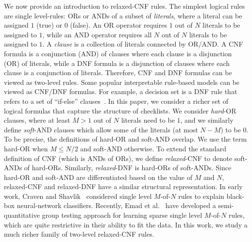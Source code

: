 We now provide an introduction to relaxed-CNF rules. The simplest logical rules are single level-rules: ORs or ANDs of a subset of \textit{literals}, where a literal can be assigned  $ 1 $ (true) or  $ 0 $ (false). 
An OR operator requires $ 1 $ out of $ N $ literals to be assigned to  $ 1 $, while an AND operator requires all $N$ out of $N$ literals to be assigned to  $ 1 $.   A \emph{clause} is a collection of literals connected by  OR/AND.  A CNF   formula  is a conjunction (AND) of {clauses} where each clause is a disjunction (OR) of {literals}, while  a DNF  formula is a disjunction of clauses where each clause is a conjunction of literals. Therefore, CNF  and DNF  formulas can be viewed as two-level rules. Some popular interpretable rule-based models can be viewed as  CNF/DNF formulas. For example, a decision set is a DNF rule that refers to a set of ``if-else'' clauses~\cite{ignatiev2018sat,lakkaraju2016interpretable}. 
In this paper, we consider a richer set of logical formulas that capture the structure of checklists. We consider \emph{hard}-OR clauses, where at least $ M > 1$ out of $ N $ literals need to be $ 1 $, and we similarly define {\emph{soft}-AND} clauses which allow some of the literals (at most $ N-M $) to be $ 0 $. 
To be precise,  the definitions of hard-OR and soft-AND overlap. We use the term hard-OR when $M \le N/2$ and soft-AND otherwise.     
To extend the standard definition of CNF (which is ANDs of ORs),  we define \emph{relaxed}-CNF to denote soft-ANDs of hard-ORs. Similarly, \emph{relaxed}-DNF is hard-ORs of soft-ANDs. Since   hard-OR and soft-AND are differentiated based on the value of $ M $ and $ N $, relaxed-CNF and relaxed-DNF have a similar structural representation.
In early work, Craven and Shavlik~\cite{craven1996extracting} considered single level $ M $-of-$ N $ rules to explain black-box neural-network classifiers. Recently, Emad et al.~\cite{EVM2015} have developed a semi-quantitative group testing approach for learning sparse single level $M$-of-$N$ rules, which are quite restrictive in their ability to fit the data. In this work, we study a much richer family of two-level relaxed-CNF rules. 



